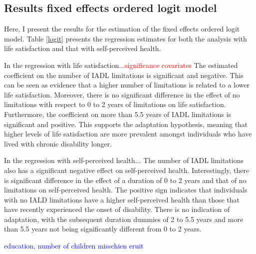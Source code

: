 \documentclass[12pt]{article}
\begin{document}
\FloatBarrier

\clearpage

\subsection{Results fixed effects ordered logit model}

Here, I present the results for the estimation of the fixed effects ordered logit model. Table \ref{logit} presents the regression estimates for both the analysis with life satisfaction and that with self-perceived health. 

In the regression with life satisfaction...\textcolor{red}{significance covariates} The estimated coefficient on the number of IADL limitations is significant and negative. This can be seen as evidence that a higher number of limitations is related to a lower life satisfaction. Moreover, there is no significant difference in the effect of no limitations with respect to 0 to 2 years of limitations on life satisfaction. Furthermore, the coefficient on more than 5.5 years of IADL limitations is significant and positive. This supports the adaptation hypothesis, meaning that higher levels of life satisfaction are more prevalent amongst individuals who have lived with chronic disability longer.   

In the regression with self-perceived health... The number of IADL limitations also has a significant negative effect on self-perceived health. Interestingly, there is significant difference in the effect of a duration of 0 to 2 years and that of no limitations on self-perceived health. The positive sign indicates that individuals with no IALD limitations have a higher self-perceived health than those that have recently experienced the onset of disability. There is no indication of adaptation, with the subsequent duration dummies of 2 to 5.5 years and more than 5.5 years not being significantly different from 0 to 2 years. 

\textcolor{blue}{education, number of children misschien eruit}
\end{document}
